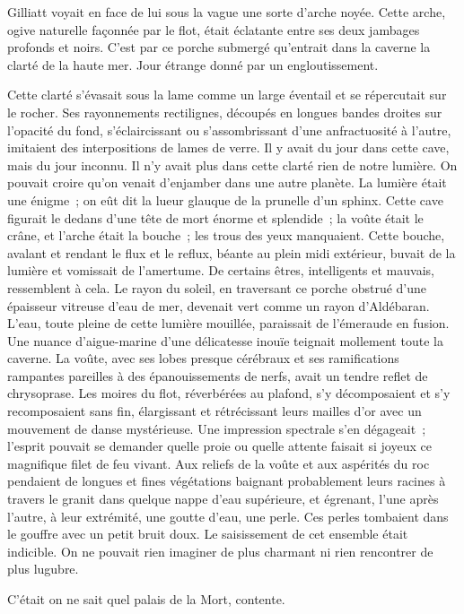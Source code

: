 \documentclass[french,twoside]{book} %
\begin{document}
Gilliatt voyait en face de lui sous la vague une sorte d’arche noyée. Cette arche, ogive naturelle façonnée par le flot, était éclatante entre ses deux jambages profonds et noirs. C’est par ce porche submergé qu’entrait dans la caverne la clarté de la haute mer. Jour étrange donné par un engloutissement.\par
Cette clarté s’évasait sous la lame comme un large éventail et se répercutait sur le rocher. Ses rayonnements rectilignes, découpés en longues bandes droites sur l’opacité du fond, s’éclaircissant ou s’assombrissant d’une anfractuosité à l’autre, imitaient des interpositions de lames de verre. Il y avait du jour dans cette cave, mais du jour inconnu. Il n’y avait plus  dans cette clarté rien de notre lumière. On pouvait croire qu’on venait d’enjamber dans une autre planète. La lumière était une énigme ; on eût dit la lueur glauque de la prunelle d’un sphinx. Cette cave figurait le dedans d’une tête de mort énorme et splendide ; la voûte était le crâne, et l’arche était la bouche ; les trous des yeux manquaient. Cette bouche, avalant et rendant le flux et le reflux, béante au plein midi extérieur, buvait de la lumière et vomissait de l’amertume. De certains êtres, intelligents et mauvais, ressemblent à cela. Le rayon du soleil, en traversant ce porche obstrué d’une épaisseur vitreuse d’eau de mer, devenait vert comme un rayon d’Aldébaran. L’eau, toute pleine de cette lumière mouillée, paraissait de l’émeraude en fusion. Une nuance d’aigue-marine d’une délicatesse inouïe teignait mollement toute la caverne. La voûte, avec ses lobes presque cérébraux et ses ramifications rampantes pareilles à des épanouissements de nerfs, avait un tendre reflet de chrysoprase. Les moires du flot, réverbérées au plafond, s’y décomposaient et s’y recomposaient sans fin, élargissant et rétrécissant leurs mailles d’or avec un mouvement de danse mystérieuse. Une impression spectrale s’en dégageait ; l’esprit pouvait se demander quelle proie ou quelle attente faisait si joyeux ce magnifique filet de feu vivant. Aux reliefs de la voûte et aux aspérités du roc pendaient de longues et fines végétations baignant probablement leurs racines à travers le granit dans quelque nappe d’eau supérieure, et égrenant, l’une après l’autre, à leur extrémité, une goutte d’eau, une perle. Ces perles  tombaient dans le gouffre avec un petit bruit doux. Le saisissement de cet ensemble était indicible. On ne pouvait rien imaginer de plus charmant ni rien rencontrer de plus lugubre.\par
C’était on ne sait quel palais de la Mort, contente.
\end{document}
